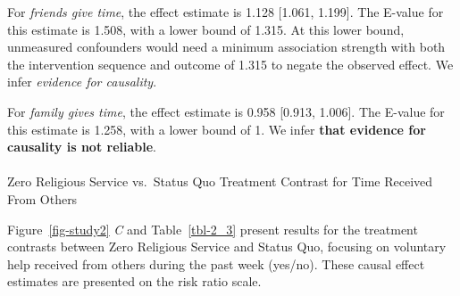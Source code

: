 \documentclass[
  single column]{article}
\makeatletter
\let\oldparagraph\paragraph
\renewcommand{\paragraph}{
    \@ifstar
      \xxxParagraphStar
      \xxxParagraphNoStar
  }
\newcommand{\xxxParagraphStar}[1]{\oldparagraph*{#1}\mbox{}}
\newcommand{\xxxParagraphNoStar}[1]{\oldparagraph{#1}\mbox{}}
\makeatother
\begin{document}
For \emph{friends give time}, the effect estimate is 1.128 {[}1.061,
1.199{]}. The E-value for this estimate is 1.508, with a lower bound of
1.315. At this lower bound, unmeasured confounders would need a minimum
association strength with both the intervention sequence and outcome of
1.315 to negate the observed effect. We infer \emph{evidence for
causality}.

For \emph{family gives time}, the effect estimate is 0.958 {[}0.913,
1.006{]}. The E-value for this estimate is 1.258, with a lower bound of
1. We infer \textbf{that evidence for causality is not reliable}.

\paragraph{Zero Religious Service vs.~Status Quo Treatment Contrast for
Time Received From
Others}\label{zero-religious-service-vs.-status-quo-treatment-contrast-for-time-received-from-others}

Figure~\ref{fig-study2} \emph{C} and Table~\ref{tbl-2_3} present results
for the treatment contrasts between Zero Religious Service and Status
Quo, focusing on voluntary help received from others during the past
week (yes/no). These causal effect estimates are presented on the risk
ratio scale.
\end{document}
